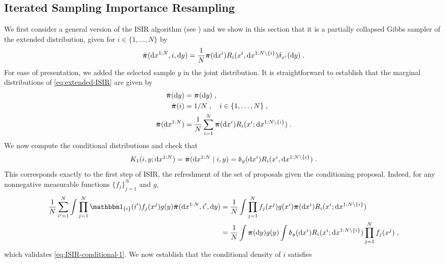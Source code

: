 \subsection{Iterated Sampling Importance Resampling}
\label{subsec:ISIR-partially-collapsed-dependent}
We first consider a general version of the ISIR algorithm (see \cite{tjelmeland2004using,andrieu2010particle,ruiz:titsias:doucet:2020}) and we show in this section that it is a partially collapsed Gibbs sampler \cite{vandyk:park:2008} of the extended distribution, given for $i \in \{1,\dots,N\}$ by
\begin{equation}
\label{eq:extended-ISIR}
\bar{\boldsymbol{\pi}}(\mathrm{d} x^{1:N},i, \mathrm{d} y)= \frac{1}{N} \boldsymbol{\pi}(\mathrm{d} x^i) R_i(x^i, \mathrm{d} x^{1:N \setminus \{i\}}) \delta_{x^i}(\mathrm{d} y) \;.
\end{equation}
For ease of presentation, we added the selected sample $y$ in the joint distribution.
It is straightforward to establish that the marginal distributions of \eqref{eq:extended-ISIR} are given by
\begin{align}
\label{eq:marginal-y}
\bar{\boldsymbol{\pi}}(\mathrm{d} y) &=\boldsymbol{\pi}(\mathrm{d} y)  \;, \\
\label{eq:marginal-i}
\bar{\boldsymbol{\pi}}(i) &= 1/N \;, \quad i \in \{1,\dots,N\} \;, \\
\label{eq:marginal-x}
\bar{\boldsymbol{\pi}}(\mathrm{d} x^{1:N})&= \frac{1}{N} \sum_{i=1}^N \boldsymbol{\pi}(\mathrm{d} x^i) R_i(x^i; \mathrm{d} x^{1:N \setminus \{i\}}) \;.
\end{align}
We now compute the conditional distributions and  check that
\begin{equation}
\label{eq:ISIR-conditional-1}
K_1(i,y; \mathrm{d} x^{1:N}) = \bar{\boldsymbol{\pi}}(\mathrm{d} x^{1:N} \mid i,y) = \updelta_y(\mathrm{d} x^i) R_i(x^i, \mathrm{d} x^{1:N \setminus \{i\}}) \;.
\end{equation}
This corresponds exactly to the first step of ISIR, the refreshment of the set of proposals given the conditioning proposal. Indeed, for any nonnegative measurable functions $\{f_j\}_{j=1}^N$ and $g$,
\begin{align*}
 \frac{1}{N} \sum_{i'=1}^N\int \prod_{j=1}^N \indiacc{i}(i') f_j(x^j) g(y) \bmeaspi(\rmd \chunku{x}{1}{N},i', \rmd y) & = \frac{1}{N} \int \prod_{j=1}^N f_j(x^j) g(x^i) \measpi(\rmd x^i) R_i(x^i; \rmd \chunkum{x}{1}{N}{i}) \\
& = \frac{1}{N} \int \measpi(\rmd y) g(y) \int \updelta_y(\rmd x^i) R_i(x^i; \rmd \chunkum{x}{1}{N}{i}) \prod_{j=1}^N f_j(x^j) \eqsp,
\end{align*}
which validates  \eqref{eq:ISIR-conditional-1}. We now establish that the conditional density of $i$ satisfies
